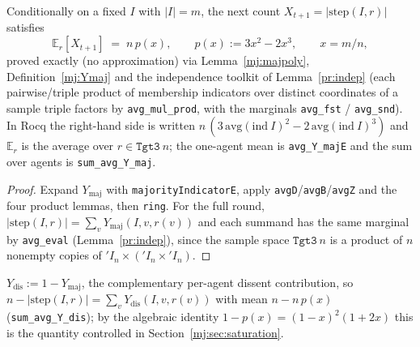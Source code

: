 \begin{lemma}\label{mj:drift}
  \rocqok
  Conditionally on a fixed $I$ with $|I|=m$, the next count
  $X_{t+1} = |\mathrm{step}(I,r)|$ satisfies
  \[
    \mathbb{E}_r[X_{t+1}] \;=\; n\,p(x), \qquad p(x) := 3x^2-2x^3, \qquad x = m/n,
  \]
  proved exactly (no approximation) via Lemma~\ref{mj:majpoly},
  Definition~\ref{mj:Ymaj} and the independence toolkit of
  Lemma~\ref{pr:indep} (each pairwise/triple product of membership
  indicators over distinct coordinates of a sample triple factors by
  \texttt{avg\_mul\_prod}, with the marginals \texttt{avg\_fst} /
  \texttt{avg\_snd}). In Rocq the right-hand side is written
  $n\,(3\,\mathrm{avg}(\mathrm{ind}\ I)^2 - 2\,\mathrm{avg}(\mathrm{ind}\ I)^3)$
  and $\mathbb{E}_r$ is the average over $r \in \texttt{Tgt3}\ n$; the
  one-agent mean is \texttt{avg\_Y\_majE} and the sum over agents is
  \texttt{sum\_avg\_Y\_maj}.
\end{lemma}
\begin{proof}
  \rocqok
  Expand $Y_{\mathrm{maj}}$ with \texttt{majorityIndicatorE}, apply
  \texttt{avgD}/\texttt{avgB}/\texttt{avgZ} and the four product lemmas,
  then \texttt{ring}. For the full round, $|\mathrm{step}(I,r)|
  = \sum_v Y_{\mathrm{maj}}(I,v,r(v))$ and each summand has the same
  marginal by \texttt{avg\_eval} (Lemma~\ref{pr:indep}), since the sample
  space $\texttt{Tgt3}\ n$ is a product of $n$ nonempty copies of
  $'I_n \times ('I_n \times 'I_n)$.
\end{proof}

\begin{definition}\label{mj:Ydis}
  \rocqok
  $Y_{\mathrm{dis}} := 1 - Y_{\mathrm{maj}}$, the complementary per-agent
  dissent contribution, so $n - |\mathrm{step}(I,r)| = \sum_v
  Y_{\mathrm{dis}}(I,v,r(v))$ with mean $n - n\,p(x)$
  (\texttt{sum\_avg\_Y\_dis}); by the algebraic identity
  $1-p(x) = (1-x)^2(1+2x)$ this is the quantity controlled in
  Section~\ref{mj:sec:saturation}.
\end{definition}

